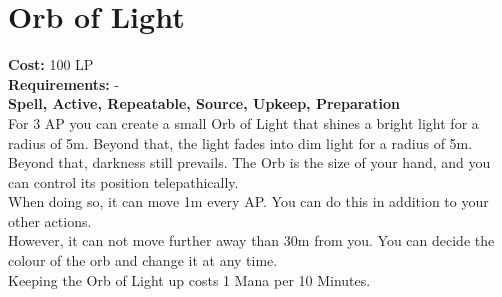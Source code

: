 \section{Orb of Light}\label{spell:orbOfLight}
\textbf{Cost:} 100 LP\\
\textbf{Requirements:} -\\
\textbf{Spell, Active, Repeatable, Source, Upkeep, Preparation}\\
For 3 AP you can create a small Orb of Light that shines a bright light for a radius of 5m.
Beyond that, the light fades into dim light for a radius of 5m.
Beyond that, darkness still prevails.
The Orb is the size of your hand, and you can control its position telepathically.\\
When doing so, it can move 1m every AP.
You can do this in addition to your other actions.\\
However, it can not move further away than 30m from you.
You can decide the colour of the orb and change it at any time. \\
Keeping the Orb of Light up costs 1 Mana per 10 Minutes.